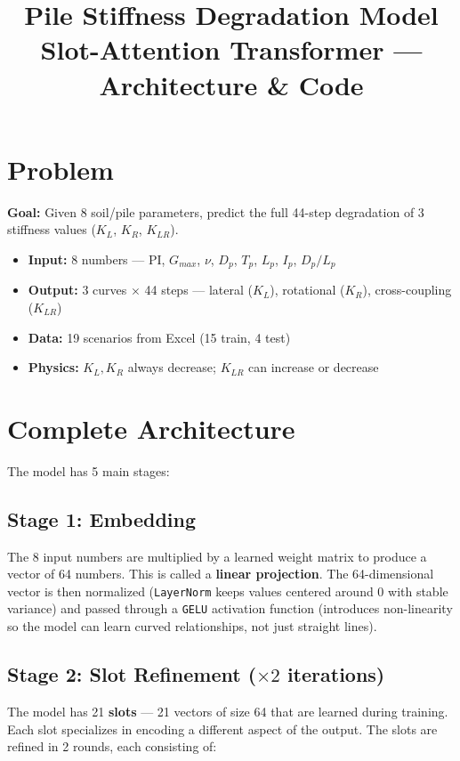 \documentclass[11pt,a4paper]{article}
\title{\textbf{Pile Stiffness Degradation Model}\\[0.3cm]\large Slot-Attention Transformer --- Architecture \& Code}
\author{}
\date{}
\begin{document}
\maketitle

\section{Problem}

\textbf{Goal:} Given 8 soil/pile parameters, predict the full 44-step degradation of 3 stiffness values ($K_L$, $K_R$, $K_{LR}$).

\begin{itemize}[nosep]
    \item \textbf{Input:} 8 numbers --- PI, $G_{max}$, $\nu$, $D_p$, $T_p$, $L_p$, $I_p$, $D_p/L_p$
    \item \textbf{Output:} 3 curves $\times$ 44 steps --- lateral ($K_L$), rotational ($K_R$), cross-coupling ($K_{LR}$)
    \item \textbf{Data:} 19 scenarios from Excel (15 train, 4 test)
    \item \textbf{Physics:} $K_L, K_R$ always decrease; $K_{LR}$ can increase or decrease
\end{itemize}

\section{Complete Architecture}

The model has 5 main stages:

\subsection*{Stage 1: Embedding}
The 8 input numbers are multiplied by a learned weight matrix to produce a vector of 64 numbers. This is called a \textbf{linear projection}. The 64-dimensional vector is then normalized (\texttt{LayerNorm} keeps values centered around 0 with stable variance) and passed through a \texttt{GELU} activation function (introduces non-linearity so the model can learn curved relationships, not just straight lines).

\subsection*{Stage 2: Slot Refinement ($\times 2$ iterations)}
The model has 21 \textbf{slots} --- 21 vectors of size 64 that are learned during training. Each slot specializes in encoding a different aspect of the output. The slots are refined in 2 rounds, each consisting of:
\end{document}

